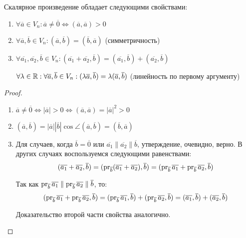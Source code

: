     \begin{theorem}
    	Скалярное произведение обладает следующими свойствами:
    	\begin{enumerate}
    		\item $\forall \overline{a} \in V_n: \overline{a} \ne \overline{0} \Leftrightarrow (\overline{a}, \overline{a}) > 0$
    		\item $\forall \overline{a}, \overline{b} \in V_n: (\overline{a}, \overline{b}) = (\overline{b}, \overline{a})$ (симметричность)
    		\item $\forall \overline{a_1}, \overline{a_2}, \overline{b} \in V_n: (\overline{a_1} + \overline{a_2}, \overline{b}) = (\overline{a_1}, \overline{b}) + (\overline{a_2}, \overline{b})$
    		
    		$\forall \lambda \in \mathbb{R}: \forall \overline{a}, \overline{b} \in V_n: (\lambda\overline{a}, \overline{b}) = \lambda(\overline{a}, \overline{b})$ (линейность по первому аргументу)
    	\end{enumerate}
    \end{theorem}
    
    \begin{proof}~
    	\begin{enumerate}
    		\item $\overline{a} \ne \overline{0} \Leftrightarrow |\overline{a}| > 0 \Leftrightarrow (\overline{a}, \overline{a}) = |\overline{a}|^2 > 0$
    		\item $(\overline{a}, \overline{b}) = |\overline{a}||\overline{b}|\cos{\angle(\overline{a}, \overline{b})} = (\overline{b}, \overline{a})$
    		\item Для случаев, когда $\overline{b} = \overline{0}$ или $\overline{a_1} \parallel \overline{a_2} \parallel \overline{b}$, утверждение, очевидно, верно. В других случаях воспользуемся следующими равенствами:
    		\[(\overline{a_1} + \overline{a_2}, \overline{b}) = (\operatorname{pr}_{\overline{b}}(\overline{a_1} + \overline{a_2}), \overline{b}) = (\operatorname{pr}_{\overline{b}}\overline{a_1} + \operatorname{pr}_{\overline{b}}\overline{a_2}, \overline{b})\]
    		
    		Так как $\operatorname{pr}_{\overline{b}}\overline{a_1} \parallel \operatorname{pr}_{\overline{b}}\overline{a_2} \parallel \overline{b}$, то:
    		\[(\operatorname{pr}_{\overline{b}}\overline{a_1} + \operatorname{pr}_{\overline{b}}\overline{a_2}, \overline{b}) = (\operatorname{pr}_{\overline{b}}\overline{a_1}, \overline{b}) + (\operatorname{pr}_{\overline{b}}\overline{a_2}, \overline{b}) = (\overline{a_1}, \overline{b}) + (\overline{a_2}, \overline{b})\]
    		
    		Доказательство второй части свойства аналогично.\qedhere
    	\end{enumerate}
    \end{proof}
    

